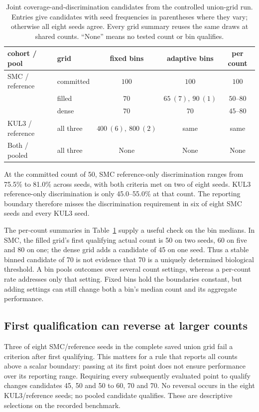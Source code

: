 \begin{table}[htbp]
\centering\small
\caption{Joint coverage-and-discrimination candidates from the controlled
union-grid run. Entries give candidates with seed frequencies in parentheses
where they vary; otherwise all eight seeds agree. Every grid summary reuses the
same draws at shared counts. ``None'' means no tested count or bin qualifies.}
\label{tab:controlledgrid}
\begin{tabular}{@{}llccc@{}}
\toprule
cohort / pool & grid & fixed bins & adaptive bins & per count \\
\midrule
SMC / reference & committed & $100$ & $100$ & $100$ \\
 & filled & $70$ & $65\ (7),\ 90\ (1)$ & $50$--$80$ \\
 & dense & $70$ & $70$ & $45$--$80$ \\
KUL3 / reference & all three & $400\ (6),\ 800\ (2)$ & same & same \\
Both / pooled & all three & None & None & None \\
\bottomrule
\end{tabular}
\end{table}

At the committed count of 50, SMC reference-only discrimination ranges
from 75.5\% to 81.0\% across seeds, with both criteria met on two of eight
seeds. KUL3 reference-only discrimination is only 45.0--55.0\% at that count.
The reporting boundary therefore misses the discrimination requirement in
six of eight SMC seeds and every KUL3 seed.

The per-count summaries in Table~\ref{tab:controlledgrid} supply a useful
check on the bin medians. In SMC, the filled grid's first qualifying actual
count is 50 on two seeds, 60 on five and 80 on one; the dense grid adds a
candidate of 45 on one seed. Thus a stable binned candidate of 70 is not
evidence that 70 is a uniquely determined biological threshold. A bin pools
outcomes over several count settings, whereas a per-count rate addresses only
that setting. Fixed bins hold the boundaries constant, but adding settings can
still change both a bin's median count and its aggregate performance.

\subsection{First qualification can reverse at larger counts}\label{sec:reversals}
Three of eight SMC/reference seeds in the complete saved union grid fail a
criterion after first qualifying. This matters for
a rule that reports all counts above a scalar boundary: passing at its first
point does not ensure performance over its reporting range. Requiring every
subsequently evaluated point to qualify changes candidates 45, 50 and 50 to
60, 70 and 70. No reversal occurs in the eight KUL3/reference seeds; no pooled
candidate qualifies. These are descriptive selections on the recorded benchmark.


